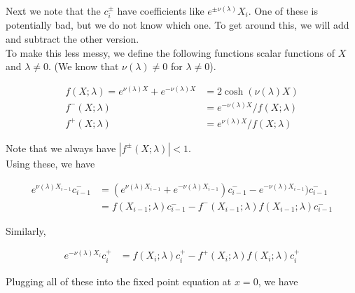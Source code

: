 \documentclass[12pt]{article}
\begin{document}
\begin{enumerate}
Next we note that the $c_i^\pm$ have coefficients like $e^{\pm \nu(\lambda) }X_i$. One of these is potentially bad, but we do not know which one. To get around this, we will add and subtract the other version. \\

To make this less messy, we define the following functions scalar functions of $X$ and $\lambda \neq 0$. (We know that $\nu(\lambda) \neq 0$ for $\lambda \neq 0$).

\begin{align*}
f(X; \lambda) = e^{\nu(\lambda)X} + e^{-\nu(\lambda)X} &= 2 \cosh (\nu(\lambda) X) \\
f^-(X; \lambda) &= e^{-\nu(\lambda)X} / f(X; \lambda) \\
f^+(X; \lambda) &= e^{\nu(\lambda)X} / f(X; \lambda)
\end{align*}

Note that we always have $|f^\pm(X; \lambda)| < 1$.\\

Using these, we have

\begin{align*}
e^{\nu(\lambda)X_{i-1}} c_{i-1}^- &= (e^{\nu(\lambda)X_{i-1}} + e^{-\nu(\lambda)X_{i-1}})c_{i-1}^- - e^{-\nu(\lambda)X_{i-1}})c_{i-1}^- \\
&= f(X_{i-1}; \lambda) c_{i-1}^- - f^-(X_{i-1}; \lambda)f(X_{i-1}; \lambda) c_{i-1}^-
\end{align*}

Similarly,

\begin{align*}
e^{-\nu(\lambda)X_i} c_i^+ &= f(X_i; \lambda) c_i^+ - f^+(X_i; \lambda)f(X_i; \lambda) c_i^+
\end{align*}

Plugging all of these into the fixed point equation at $x = 0$, we have


\end{enumerate}
\end{document}
